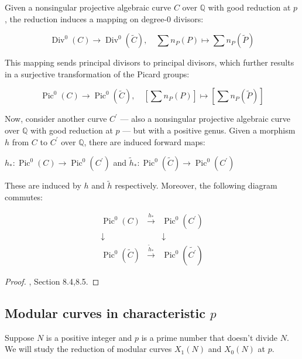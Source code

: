 \begin{theorem}
Given a nonsingular projective algebraic curve \( C \) over \( \mathbb{Q} \) with good reduction at \( p \), the reduction induces a mapping on degree-0 divisors:

\[
\operatorname{Div}^{0}(C) \longrightarrow \operatorname{Div}^{0}(\widetilde{C}), \quad \sum n_{P}(P) \mapsto \sum n_{P}(\widetilde{P})
\]

This mapping sends principal divisors to principal divisors, which further results in a surjective transformation of the Picard groups:

\[
\operatorname{Pic}^{0}(C) \longrightarrow \operatorname{Pic}^{0}(\widetilde{C}), \quad\left[\sum n_{P}(P)\right] \mapsto\left[\sum n_{P}(\widetilde{P})\right]
\]

Now, consider another curve \( C^{\prime} \) — also a nonsingular projective algebraic curve over \( \mathbb{Q} \) with good reduction at \( p \) — but with a positive genus. Given a morphism \( h \) from \( C \) to \( C^{\prime} \) over \( \mathbb{Q} \), there are induced forward maps:

\( h_{*}: \operatorname{Pic}^{0}(C) \longrightarrow \operatorname{Pic}^{0}\left(C^{\prime}\right) \)
and
\( \tilde{h}_{*}: \operatorname{Pic}^{0}(\widetilde{C}) \longrightarrow \operatorname{Pic}^{0}\left(C^{\prime}\right) \)

These are induced by \( h \) and \( \tilde{h} \) respectively.
Moreover, the following diagram commutes:


\[
\begin{array}{ccc}
\operatorname{Pic}^{0}(C) & \xrightarrow{h_{*}} & \operatorname{Pic}^{0}\left(C^{\prime}\right) \\
\downarrow & & \downarrow \\
\operatorname{Pic}^{0}(\widetilde{C}) & \xrightarrow{\tilde{h}_{*}} & \operatorname{Pic}^{0}(\widetilde{C^{\prime}})
\end{array}
\]
\begin{proof}
\cite{diamond2005first}, Section 8.4,8.5. 
    
\end{proof}

\end{theorem}



\subsection{Modular curves in characteristic $p$}
Suppose \( N \) is a positive integer and \( p \) is a prime number that doesn't divide \( N \). We will study the reduction of modular curves \( X_{1}(N) \) and \( X_{0}(N) \) at \( p \).

